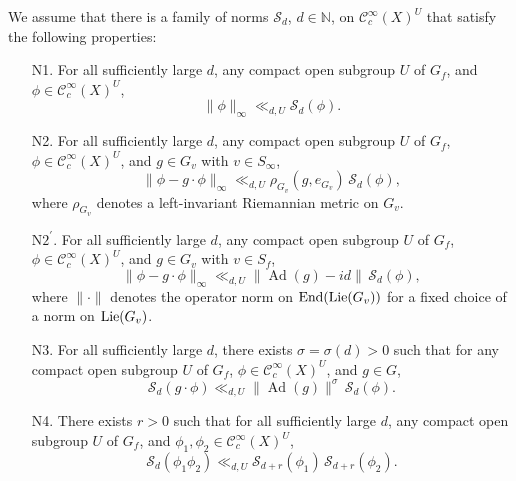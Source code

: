 \documentclass[11pt,reqno,a4paper]{amsart}
\numberwithin{equation}{section}
\newcommand{\cC}{\mathcal{C}}
\newcommand{\cS}{\mathcal{S}}
\DeclareMathOperator{\Ad}{Ad}
\theoremstyle{theorem}
\theoremstyle{definition}
\begin{document}
We assume that there is a family of norms $\cS_d$, $d\in \mathbb{N}$, on $\cC_c^\infty(X)^U$
that satisfy the following properties:
\begin{enumerate}
	\setlength\itemsep{0.5em}
	\item[N1.] For all sufficiently large $d$, any compact open subgroup $U$ of $G_f$, and $\phi \in\cC_c^\infty(X)^U$,
	\begin{equation}
	\label{a1}
	\|\phi\|_\infty \ll_{d,U}  \cS_d(\phi).
	\end{equation}
	
	\item[N2.] For all sufficiently large $d$, any compact open subgroup $U$ of $G_f$, $\phi \in\cC_c^\infty(X)^U$, and $g\in G_v$ with $v\in S_\infty$,
	\begin{equation}
	\label{a2}
	\|\phi - g \cdot \phi\|_\infty \ll_{d,U} \rho_{G_v}(g,e_{G_v}) \, \cS_d(\phi),
	\end{equation}
	where $\rho_{G_v}$ denotes a left-invariant Riemannian metric on $G_v$.
	
	\item[N$2^\prime$.] For all sufficiently large $d$, any compact open subgroup $U$ of $G_f$, $\phi \in\cC_c^\infty(X)^U$, and $g\in G_v$ with $v\in S_f$,
	\begin{equation}
	\label{a2'}
	\|\phi - g \cdot \phi\|_\infty \ll_{d,U} \|\Ad(g)-id\| \, \cS_d(\phi),
	\end{equation}
	where $\|\cdot \|$ denotes the operator norm on $\hbox{End}(\hbox{Lie}(G_v))$
	for a fixed choice of a norm on $\hbox{Lie}(G_v)$.
	
	\item[N3.] For all sufficiently large $d$, there exists $\sigma=\sigma(d)>0$
	such that for any compact open subgroup $U$ of $G_f$, $\phi \in\cC_c^\infty(X)^U$, and $g\in G$,
	\begin{equation}
	\label{a3}
	\cS_d(g \cdot \phi) \ll_{d,U} \|\Ad(g)\|^{\sigma} \, \cS_d(\phi).
	\end{equation}
	
	\item[N4.] There exists $r > 0$ such that for all sufficiently large $d$, any compact open subgroup $U$ of $G_f$,
	and $\phi_1, \phi_2 \in\cC_c^\infty(X)^U$,
	\begin{equation}
	\label{a4}
	\cS_d(\phi_1 \phi_2) \ll_{d,U} \cS_{d+r}(\phi_1) \, \cS_{d+r}(\phi_2).
	\end{equation}
\end{enumerate}
\end{document}
